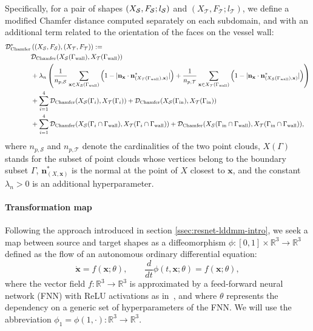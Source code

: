 Specifically, for a pair of shapes $(X_{\mathcal S},F_{\mathcal S};l_{\mathcal S})$ and $(X_{\mathcal T},F_{\mathcal T}; l_{\mathcal T})$, 
we define a modified Chamfer distance computed separately on each subdomain, and with an additional term related to the orientation of the faces on the vessel wall:
\begin{equation}\label{eq:mesh-chamfer}
\begin{aligned}
  \mathcal{D}_{\text{Chamfer}}^*&\left((X_{\mathcal S},F_{\mathcal S}),(X_{\mathcal T},F_{\mathcal T})\right) := \\
& \mathcal{D}_{\text{Chamfer}}(X_{\mathcal S}(\Gamma_{\text{wall}}), X_{\mathcal T}(\Gamma_{\text{wall}})) \\
& +   \lambda_n \left( 
  \frac{1}{n_{p,\mathcal{S}}}\sum_{\mathbf x\in X_{\mathcal S}(\Gamma_{\text{wall}})}   \left(1-\lvert \mathbf{n}_{\mathbf x}\cdot\mathbf{n}^*_{(X_{\mathcal T}(\Gamma_{\text{wall}}),{\mathbf x})} \rvert \right)
   +    \frac{1}{n_{p,\mathcal{T}}}\sum_{\mathbf x\in X_{\mathcal T}(\Gamma_{\text{wall}})}   \left(1-\lvert \mathbf{n}_{\mathbf x}\cdot\mathbf{n}^*_{(X_{\mathcal S}(\Gamma_{\text{wall}}),{\mathbf x})} \rvert \right)
   \right)\\
&  + \sum_{i=1}^{4} \mathcal{D}_{\text{Chamfer}}(X_{\mathcal S}(\Gamma_i), X_{\mathcal T}(\Gamma_i)) + \mathcal{D}_{\text{Chamfer}}(X_{\mathcal S}(\Gamma_{\text{in}}), X_{\mathcal T}(\Gamma_{\text{in}})) \\
& +  \sum_{i=1}^{4} \mathcal{D}_{\text{Chamfer}}(X_{\mathcal S}(\Gamma_i\cap\Gamma_{\text{wall}}), X_{\mathcal T}(\Gamma_i\cap\Gamma_{\text{wall}}))+\mathcal{D}_{\text{Chamfer}}(X_{\mathcal S}(\Gamma_{\text{in}}\cap\Gamma_{\text{wall}}), X_{\mathcal T}(\Gamma_{\text{in}}\cap\Gamma_{\text{wall}})),
\end{aligned}
\end{equation}
where $n_{p, \mathcal S}$ and $n_{p,\mathcal T}$ denote the cardinalities of the two point clouds,
$X(\Gamma)$ stands for the subset of point clouds whose vertices belong to the boundary subset $\Gamma$, 
$\mathbf{n}^*_{(X,{\mathbf x})}$ is the normal at the point of $X$ closest to $\mathbf x$, and the constant $\lambda_n>0$ is an additional hyperparameter.

\paragraph*{Transformation map} 
Following the approach introduced in section \ref{ssec:resnet-lddmm-intro}, we seek a map between source and target shapes as a diffeomorphism $\phi:[0,1]\times\mathbb{R}^3\rightarrow\mathbb{R}^3$ defined as the flow of an autonomous ordinary differential equation:
\begin{equation}\label{eq:resnet-fnn-ode}
  \dot{\mathbf x} = f(\mathbf x;\theta),\qquad \frac{d}{dt}\phi(t, \mathbf x;\theta)=f(\mathbf  x;\theta),
\end{equation}
where the vector field $f:\mathbb{R}^3\rightarrow\mathbb{R}^3$ is approximated by a feed-forward neural network (FNN) with ReLU activations as in~\cite{amor2022resnet},
and where $\theta$ represents the dependency on a generic set of hyperparameters of the FNN. We will use the abbreviation $\phi_1=\phi(1,\cdot):\mathbb{R}^3\rightarrow\mathbb{R}^3$.

